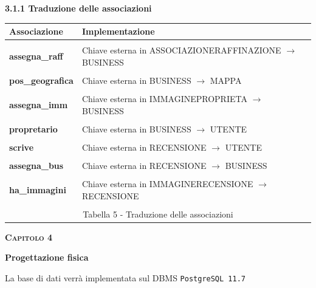 \documentclass[a4paper,12pt]{article}
\begin{document}
\newpage\null{}\setcounter{page}{11}
\vspace{-2cm}
\begin{flushleft}
{\bf 3.1.1 Traduzione delle associazioni} 
\vspace{+1cm}

\begin{table}[htbp]
\begin{tabular}[c]{ p{3.5cm}  p{11.5cm} }
\hline
\bf Associazione&\bf Implementazione\\
\hline\\
{\bf assegna\_raff}
&\small Chiave esterna in ASSOCIAZIONERAFFINAZIONE $\rightarrow$ BUSINESS
\\
\\
{\bf pos\_geografica}
&\small Chiave esterna in BUSINESS $\rightarrow$ MAPPA
\\
\\
{\bf assegna\_imm}
&\small Chiave esterna in IMMAGINEPROPRIETA $\rightarrow$ BUSINESS
\\
\\
{\bf propretario}
&\small Chiave esterna in BUSINESS $\rightarrow$ UTENTE
\\
\\
{\bf scrive}
&\small Chiave esterna in RECENSIONE $\rightarrow$ UTENTE
\\
\\
{\bf assegna\_bus}
&\small Chiave esterna in RECENSIONE $\rightarrow$ BUSINESS
\\
\\
{\bf ha\_immagini}
&\small Chiave esterna in IMMAGINERECENSIONE $\rightarrow$ RECENSIONE
\\\\
\hline
\multicolumn{2}{c}{\footnotesize{\normalsize Tabella 5 - Traduzione
delle associazioni}}
\end{tabular}
\end{table}
\end{flushleft}
\newpage

\newpage\null{}\setcounter{page}{12}
\begin{flushleft}
\vspace*{+1cm}
\Large\textsc{\bf Capitolo 4}
\vspace*{+1cm}

\begingroup
\fontsize{30pt}{12pt}\selectfont\bf{Progettazione fisica}
\endgroup

\vspace*{+1cm}
\normalsize{
La base di dati verrà implementata sul DBMS \verb|PostgreSQL 11.7|
}
\end{flushleft}
\end{document}
